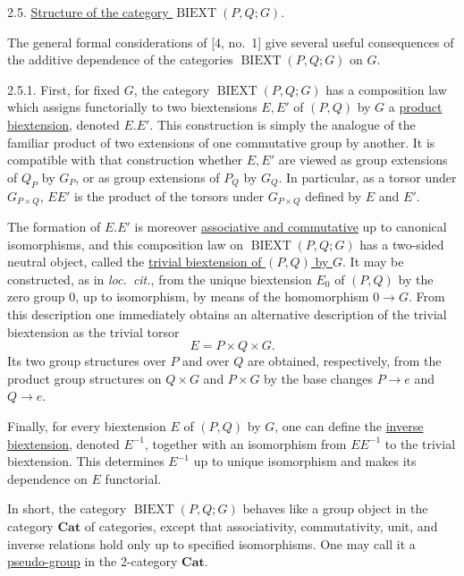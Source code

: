 
2.5. \underline{Structure of the category
$\operatorname{BIEXT}(P,Q;G)$}.

The general formal considerations of [4, no.~1] give several useful
consequences of the additive dependence of the categories
$\operatorname{BIEXT}(P,Q;G)$ on $G$.

2.5.1. First, for fixed $G$, the category
$\operatorname{BIEXT}(P,Q;G)$ has a composition law which assigns
functorially to two biextensions $E,E'$ of $(P,Q)$ by $G$ a
\underline{product biextension}, denoted $E.E'$. This construction is
simply the analogue of the familiar product of two extensions of one
commutative group by another. It is compatible with that construction
whether $E,E'$ are viewed as group extensions of $Q_P$ by $G_P$, or
as group extensions of $P_Q$ by $G_Q$. In particular, as a torsor
under $G_{P\times Q}$, $EE'$ is the product of the torsors under
$G_{P\times Q}$ defined by $E$ and $E'$.

The formation of $E.E'$ is moreover \underline{associative and
commutative} up to canonical isomorphisms, and this composition law on
$\operatorname{BIEXT}(P,Q;G)$ has a two-sided neutral object, called
the \underline{trivial biextension of $(P,Q)$ by $G$}. It may be
constructed, as in \emph{loc.\ cit.}, from the unique biextension
$E_0$ of $(P,Q)$ by the zero group $0$, up to isomorphism, by means of
the homomorphism $0\longrightarrow G$. From this description one
immediately obtains an alternative description of the trivial
biextension as the trivial torsor
\[
 E=P\times Q\times G.
\]
Its two group structures over $P$ and over $Q$ are obtained,
respectively, from the product group structures on $Q\times G$ and
$P\times G$ by the base changes $P\longrightarrow e$ and
$Q\longrightarrow e$.

Finally, for every biextension $E$ of $(P,Q)$ by $G$, one can define
the \underline{inverse biextension}, denoted $E^{-1}$, together with
an isomorphism from $EE^{-1}$ to the trivial biextension. This
determines $E^{-1}$ up to unique isomorphism and makes its dependence
on $E$ functorial.

In short, the category $\operatorname{BIEXT}(P,Q;G)$ behaves like a
group object in the category $\mathbf{Cat}$ of categories, except that
associativity, commutativity, unit, and inverse relations hold only up
to specified isomorphisms. One may call it a
\underline{pseudo-group} in the 2-category $\mathbf{Cat}$.

